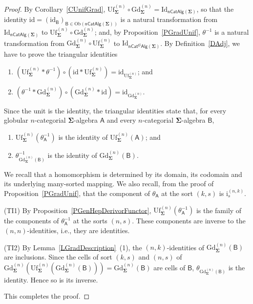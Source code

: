 \documentclass[a4paper, reqno
]{amsart}
\newcommand{\sig}[1]{\mathbf{#1}}             %
\newcommand{\calg}[1]{\boldsymbol{\mathsf{#1}}} %
\newcommand{\id}{\mathrm{id}}
\newcommand{\Id}{\mathrm{Id}}
\newcommand{\gl}{\mathrm{gl}}                %
\newcommand{\Gd}{\mathrm{Gd}}
\newcommand{\Uf}{\mathrm{Uf}}
\theoremstyle{plain}
\theoremstyle{definition}
\begin{document}
\begin{proof}
By Corollary~\ref{CUnifGrad}, $\Uf^{(n)}_{\sig{\Sigma}}\circ\Gd^{(n)}_{\sig{\Sigma}}=\Id_{\mathsf{nCatAlg}(\sig{\Sigma})}$, so that the identity $\id=(\id_{\calg{B}})_{\calg{B}\in\mathrm{Ob}(\mathsf{nCatAlg}(\sig{\Sigma}))}$ is a natural transformation from $\Id_{\mathsf{nCatAlg}(\sig{\Sigma})}$ to $\Uf^{(n)}_{\sig{\Sigma}}\circ\Gd^{(n)}_{\sig{\Sigma}}$; and, by Proposition~\ref{PGradUnif}, $\theta^{-1}$ is a natural transformation from $\Gd^{(n)}_{\sig{\Sigma}}\circ\Uf^{(n)}_{\sig{\Sigma}}$ to $\Id_{\mathsf{nCat}^{\gl}\mathsf{Alg}(\sig{\Sigma})}$.
By Definition~\ref{DAdj}, we have to prove the triangular identities
\begin{enumerate}
	\item[(TI1)]
	$\left(\Uf^{(n)}_{\sig{\Sigma}}\ast\theta^{-1}\right)\circ\left(\id\ast\Uf^{(n)}_{\sig{\Sigma}}\right)=\id_{\Uf^{(n)}_{\sig{\Sigma}}}$; and

	\item[(TI2)]
	$\left(\theta^{-1}\ast\Gd^{(n)}_{\sig{\Sigma}}\right)\circ\left(\Gd^{(n)}_{\sig{\Sigma}}\ast\id\right)=\id_{\Gd^{(n)}_{\sig{\Sigma}}}$.
\end{enumerate}
Since the unit is the identity, the triangular identities state that, for every globular $n$-categorial $\sig{\Sigma}$-algebra $\calg{A}$ and every $n$-categorial $\sig{\Sigma}$-algebra $\calg{B}$,
\begin{enumerate}
	\item[(TI1)]
	$\Uf^{(n)}_{\sig{\Sigma}}(\theta^{-1}_{\calg{A}})$ is the identity of $\Uf^{(n)}_{\sig{\Sigma}}(\calg{A})$; and

	\item[(TI2)]
	$\theta^{-1}_{\Gd^{(n)}_{\sig{\Sigma}}(\calg{B})}$ is the identity of $\Gd^{(n)}_{\sig{\Sigma}}(\calg{B})$.
\end{enumerate}
We recall that a homomorphism is determined by its domain, its codomain and its underlying many-sorted mapping.
We also recall, from the proof of Proposition~\ref{PGradUnif}, that the component of $\theta_{\calg{A}}$ at the sort $(k,s)$ is $\mathrm{i}^{(n,k)}_{s}$.

(TI1) By Proposition~\ref{PGenHepDerivorFunctor}, $\Uf^{(n)}_{\sig{\Sigma}}(\theta^{-1}_{\calg{A}})$ is the family of the components of $\theta^{-1}_{\calg{A}}$ at the sorts $(n,s)$.
These components are inverse to the $(n,n)$-identities, i.e., they are identities.

(TI2) By Lemma~\ref{LGradDescription}~(1), the $(n,k)$-identities of $\Gd^{(n)}_{\sig{\Sigma}}(\calg{B})$ are inclusions.
Since the cells of sort $(k,s)$ and $(n,s)$ of $\Gd^{(n)}_{\sig{\Sigma}}(\Uf^{(n)}_{\sig{\Sigma}}(\Gd^{(n)}_{\sig{\Sigma}}(\calg{B})))=\Gd^{(n)}_{\sig{\Sigma}}(\calg{B})$ are cells of $\calg{B}$, $\theta_{\Gd^{(n)}_{\sig{\Sigma}}(\calg{B})}$ is the identity.
Hence so is its inverse.

This completes the proof.
\end{proof}
\end{document}
